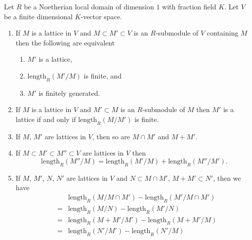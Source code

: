 \begin{lemma}
\label{lemma-compare-lattices}
Let $R$ be a Noetherian local domain of dimension $1$ with
fraction field $K$. Let $V$ be a finite dimensional $K$-vector space.
\begin{enumerate}
\item If $M$ is a lattice in $V$ and $M \subset M' \subset V$
is an $R$-submodule of $V$ containing $M$
then the following are equivalent
\begin{enumerate}
\item $M'$ is a lattice,
\item $\text{length}_R(M'/M)$ is finite, and
\item $M'$ is finitely generated.
\end{enumerate}
\item If $M$ is a lattice in $V$ and $M' \subset M$ is an $R$-submodule
of $M$ then $M'$ is a lattice if and only if
$\text{length}_R(M/M')$ is finite.
\item If $M$, $M'$ are lattices in $V$, then so are
$M \cap M'$ and $M + M'$.
\item If $M \subset M' \subset M'' \subset V$ are lattices in $V$
then
$$
\text{length}_R(M''/M) =
\text{length}_R(M'/M) +
\text{length}_R(M''/M').
$$
\item If $M$, $M'$, $N$, $N'$ are lattices in $V$ and
$N \subset M \cap M'$, $M + M' \subset N'$, then we have
\begin{eqnarray*}
& & \text{length}_R(M/M \cap M') - \text{length}_R(M'/M \cap M')\\
& = &
\text{length}_R(M/N) - \text{length}_R(M'/N) \\
& = &
\text{length}_R(M + M' / M') - \text{length}_R(M + M'/M) \\
& = &
\text{length}_R(N' / M') - \text{length}_R(N'/M)
\end{eqnarray*}
\end{enumerate}
\end{lemma}

